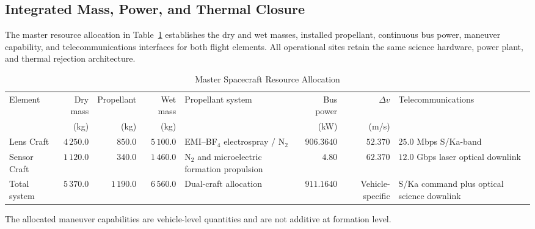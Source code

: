 \documentclass[10pt,twocolumn]{IEEEtran}
\begin{document}
\subsection{Integrated Mass, Power, and Thermal Closure}

The master resource allocation in Table~\ref{tab:mass_budget} establishes the
dry and wet masses, installed propellant, continuous bus power, maneuver
capability, and telecommunications interfaces for both flight elements. All
operational sites retain the same science hardware, power plant, and thermal
rejection architecture.

\begin{table}[t]
\caption{Master Spacecraft Resource Allocation}
\label{tab:mass_budget}
\centering
\footnotesize
\begin{tabular}{@{}lrrrp{2.25cm}rrp{2.85cm}@{}}
\toprule
Element & Dry mass & Propellant & Wet mass & Propellant system & Bus power & $\Delta v$ & Telecommunications \\
& (kg) & (kg) & (kg) & & (kW) & (m/s) & \\
\midrule
Lens Craft & $4\,250.0$ & $850.0$ & $5\,100.0$ & EMI--BF$_4$ electrospray / N$_2$ & $906.3640$ & $52.370$ & $25.0$ Mbps S/Ka-band \\
Sensor Craft & $1\,120.0$ & $340.0$ & $1\,460.0$ & N$_2$ and microelectric formation propulsion & $4.80$ & $62.370$ & $12.0$ Gbps laser optical downlink \\
\midrule
Total system & $5\,370.0$ & $1\,190.0$ & $6\,560.0$ & Dual-craft allocation & $911.1640$ & Vehicle-specific & S/Ka command plus optical science downlink \\
\bottomrule
\end{tabular}
\end{table}

The allocated maneuver capabilities are vehicle-level quantities and are not
additive at formation level.
\end{document}
